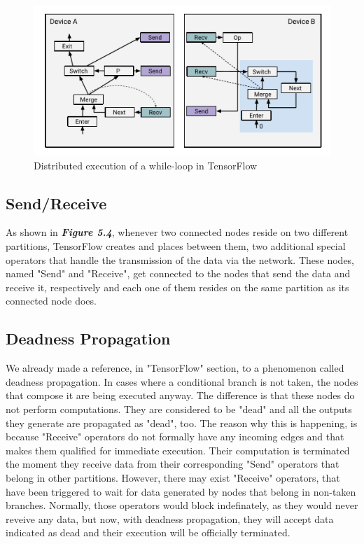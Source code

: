 \documentclass[ack,preface]{dithesis}
\begin{document}
\begin{figure}
\centering
\includegraphics[scale=1.2]{figures/sm_iteration}
\caption{Distributed execution of a while-loop in TensorFlow}
\end{figure}


    \subsection{Send/Receive}
As shown in \textit{\textbf{Figure 5.4}}, whenever two connected nodes  reside on two different partitions, TensorFlow creates and places between them, two additional special operators that handle the transmission of the data via the network. These nodes, named "Send"  and "Receive", get connected to the nodes that send the data and receive it, respectively and each one of them resides on the same partition as its connected node does. 


    \subsection{Deadness Propagation}
We already made a reference, in "TensorFlow" section, to a phenomenon called deadness propagation. In cases where a conditional branch is not taken, the nodes that compose it are being executed anyway. The difference is that these nodes do not perform computations. They are considered to be "dead" and all the outputs they generate are propagated as "dead", too. 
The reason why this is happening, is  because "Receive" operators do not formally have any incoming edges and that makes them qualified for immediate execution. Their computation is terminated the moment they receive data from their corresponding "Send" operators that belong in other partitions. However, there may exist "Receive" operators, that have been triggered to wait for data generated by nodes that belong in non-taken branches. Normally, those operators would block indefinately, as they would never reveive any data, but now, with deadness propagation, they will accept data  indicated as dead and their execution will be officially terminated.
\end{document}
